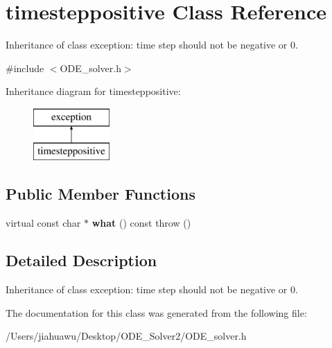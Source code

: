 \hypertarget{classtimesteppositive}{}\section{timesteppositive Class Reference}
\label{classtimesteppositive}


Inheritance of class exception\+: time step should not be negative or 0.  




{\ttfamily \#include $<$O\+D\+E\+\_\+solver.\+h$>$}

Inheritance diagram for timesteppositive\+:\begin{figure}[H]
\begin{center}
\leavevmode
\includegraphics[height=2.000000cm]{classtimesteppositive}
\end{center}
\end{figure}
\subsection*{Public Member Functions}
\begin{DoxyCompactItemize}
\item 
\mbox{\label{classtimesteppositive_a30186f6dccfeb97d3ad1a2363d62f4c4}} 
virtual const char $\ast$ {\bfseries what} () const  throw ()
\end{DoxyCompactItemize}


\subsection{Detailed Description}
Inheritance of class exception\+: time step should not be negative or 0. 

The documentation for this class was generated from the following file\+:\begin{DoxyCompactItemize}
\item 
/\+Users/jiahuawu/\+Desktop/\+O\+D\+E\+\_\+\+Solver2/O\+D\+E\+\_\+solver.\+h\end{DoxyCompactItemize}

